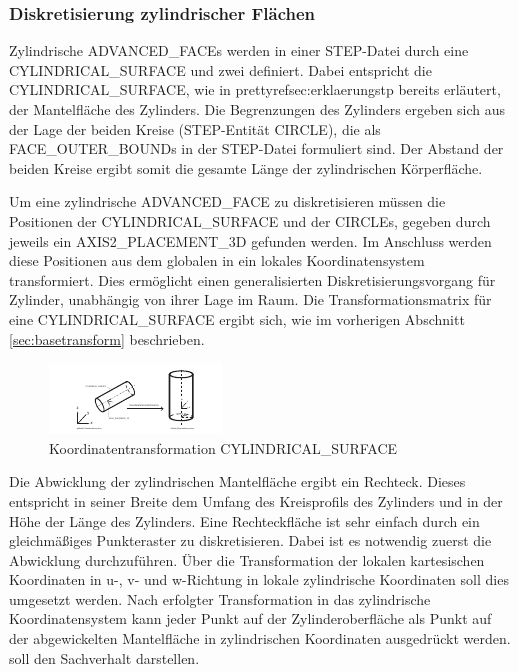 \subsubsection{Diskretisierung zylindrischer Flächen}

Zylindrische ADVANCED\_FACEs werden in einer STEP-Datei durch eine CYLINDRICAL\_SURFACE und zwei definiert. Dabei entspricht die CYLINDRICAL\_SURFACE, wie in prettyref{sec:erklaerungstp} bereits erläutert, der Mantelfläche des Zylinders. Die Begrenzungen des Zylinders ergeben sich aus der Lage der beiden Kreise (STEP-Entität CIRCLE), die als FACE\_OUTER\_BOUNDs in der STEP-Datei formuliert sind. Der Abstand der beiden Kreise ergibt somit die gesamte Länge der zylindrischen Körperfläche.

Um eine zylindrische ADVANCED\_FACE zu diskretisieren müssen die Positionen der CYLINDRICAL\_SURFACE und der CIRCLEs, gegeben durch jeweils ein AXIS2\_PLACEMENT\_3D gefunden werden. Im Anschluss werden diese Positionen aus dem globalen in ein lokales Koordinatensystem transformiert. Dies ermöglicht einen generalisierten Diskretisierungsvorgang für Zylinder, unabhängig von ihrer Lage im Raum. Die Transformationsmatrix für eine  CYLINDRICAL\_SURFACE ergibt sich, wie im vorherigen Abschnitt \ref{sec:basetransform} beschrieben.  

\begin{figure}[h]
	\centering
	
	\includegraphics[width=0.8\linewidth]{img/trafozylinder.pdf}
	
	\caption{Koordinatentransformation CYLINDRICAL\_SURFACE}
	\label{fig:trafozylinder}
	
\end{figure}

Die Abwicklung der zylindrischen Mantelfläche ergibt ein Rechteck. Dieses entspricht in seiner Breite dem Umfang des Kreisprofils des Zylinders und in der Höhe der Länge des Zylinders. Eine Rechteckfläche ist sehr einfach durch ein gleichmäßiges Punkteraster zu diskretisieren. Dabei ist es notwendig zuerst die Abwicklung durchzuführen. Über die Transformation der lokalen kartesischen Koordinaten in u-, v- und w-Richtung in lokale zylindrische Koordinaten soll dies umgesetzt werden. Nach erfolgter Transformation in das zylindrische Koordinatensystem kann jeder Punkt auf der Zylinderoberfläche als Punkt auf der abgewickelten Mantelfläche in zylindrischen Koordinaten ausgedrückt werden.  soll den Sachverhalt darstellen. 

